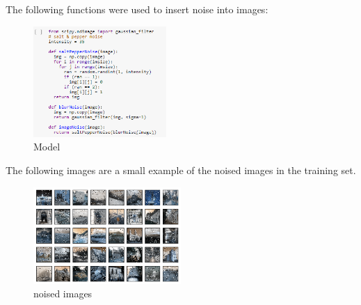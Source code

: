 \documentclass[twocolumn,showpacs,%
  nofootinbib,aps,superscriptaddress,%
  eqsecnum,prd,notitlepage,showkeys,10pt]{revtex4-1}
\begin{document}
The following functions were used to insert noise into images:
\begin{figure}[H]
\includegraphics[width=0.45\textwidth]{images/noise.PNG}
\caption{\label{fig:noise}Model}
\end{figure}
The following images are a small example of the noised images in the training set.
\begin{figure}[H]
    \includegraphics[width=0.5\textwidth]{images/64_full_noise.png}
    \caption{\label{fig:noise}noised images}
    \end{figure}
\end{document}
